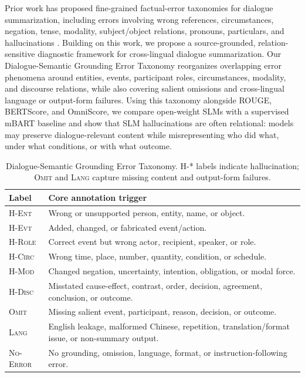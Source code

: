 \documentclass[11pt]{article}
\begin{document}
Prior work has proposed fine-grained factual-error taxonomies for dialogue summarization, including errors involving wrong references, circumstances, negation, tense, modality, subject/object relations, pronouns, particulars, and hallucinations \citep{tang-etal-2022-confit,wang-etal-2022-analyzing}. Building on this work, we propose a source-grounded, relation-sensitive diagnostic framework for cross-lingual dialogue summarization. Our Dialogue-Semantic Grounding Error Taxonomy reorganizes overlapping error phenomena around entities, events, participant roles, circumstances, modality, and discourse relations, while also covering salient omissions and cross-lingual language or output-form failures. Using this taxonomy alongside ROUGE, BERTScore, and OmniScore, we compare open-weight SLMs with a supervised mBART baseline and show that SLM hallucinations are often relational: models may preserve dialogue-relevant content while misrepresenting who did what, under what conditions, or with what outcome.


\begin{table}[H]
\centering
\scriptsize
\setlength{\tabcolsep}{2pt}
\renewcommand{\arraystretch}{0.92}
\begin{tabularx}{\columnwidth}{@{}lX@{}}
\toprule
Label & Core annotation trigger \\
\midrule
\textsc{H-Ent} & Wrong or unsupported person, entity, name, or object. \\
\textsc{H-Evt} & Added, changed, or fabricated event/action. \\
\textsc{H-Role} & Correct event but wrong actor, recipient, speaker, or role. \\
\textsc{H-Circ} & Wrong time, place, number, quantity, condition, or schedule. \\
\textsc{H-Mod} & Changed negation, uncertainty, intention, obligation, or modal force. \\
\textsc{H-Disc} & Misstated cause-effect, contrast, order, decision, agreement, conclusion, or outcome. \\
\textsc{Omit} & Missing salient event, participant, reason, decision, or outcome. \\
\textsc{Lang} & English leakage, malformed Chinese, repetition, translation/format issue, or non-summary output. \\
\textsc{No-Error} & No grounding, omission, language, format, or instruction-following error. \\
\bottomrule
\end{tabularx}
\caption{Dialogue-Semantic Grounding Error Taxonomy. \textsc{H-*} labels indicate hallucination; \textsc{Omit} and \textsc{Lang} capture missing content and output-form failures.}
\label{tab:taxonomy}
\end{table}
\end{document}
